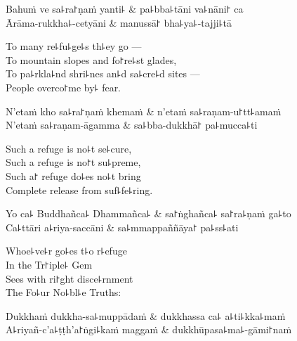 \begin{leader}
\end{leader}

\begin{twochants}
  Bahuṁ ve sa꜕ra꜓ṇaṁ yanti꜕ & pa꜕bba꜕tāni va꜕nāni꜓ ca \\
  Ārāma-rukkha꜕-cetyāni & manussā꜓ bha꜕ya꜕-tajji꜕tā \\
\end{twochants}

\begin{english}
  To many re꜕fu꜕ge꜕s th꜕ey go ---\\
  To mountain slopes and fo꜓re꜕st glades,\\
  To pa꜕rkla꜕nd shri꜕nes an꜕d sa꜕cre꜕d sites ---\\
  People overco꜓me by꜕ fear.
\end{english}

\begin{twochants}
  N'etaṁ kho sa꜕ra꜓ṇaṁ khemaṁ & n'etaṁ sa꜕raṇam-u꜓tt꜕amaṁ \\
  N'etaṁ sa꜕raṇam-āgamma & sa꜕bba-dukkhā꜓ pa꜕mucca꜕ti \\
\end{twochants}

\begin{english}
  Such a refuge is no꜕t se꜕cure,\\
  Such a refuge is no꜓t su꜕preme,\\
  Such a꜓ refuge do꜕es no꜕t bring\\
  Complete release from suf꜕fe꜕ring.
\end{english}

\begin{twochants}
  Yo ca꜕ Buddhañca꜕ Dhammañca꜕ & sa꜓ṅghañca꜕ sa꜓ra꜕ṇaṁ ga꜕to \\
  Ca꜕ttāri a꜕riya-saccāni & sa꜕mmappaññāya꜓ pa꜕ss꜕ati \\
\end{twochants}

\begin{english}
  Whoe꜕ve꜕r go꜕es t꜕o r꜕efuge\\
  In the Tr꜓iple꜕ Gem\\
  Sees with ri꜓ght disce꜕rnment\\
  The Fo꜕ur No꜕bl꜕e Truths:
\end{english}

\begin{twochants}
  Dukkhaṁ dukkha-sa꜕muppādaṁ & dukkhassa ca꜕ a꜕ti꜕kka꜕maṁ \\
  A꜕riyañ-c'a꜕ṭṭh'a꜓ṅgi꜕kaṁ maggaṁ & dukkhūpasa꜕ma꜕-gāmi꜓naṁ \\
\end{twochants}

